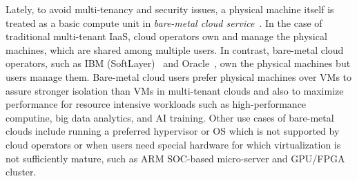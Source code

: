 Lately, to avoid multi-tenancy and security issues, a physical machine itself is 
treated as a basic compute unit in {\em bare-metal cloud service}~\cite{bms-wiki}.
In the case of traditional multi-tenant IaaS, cloud operators own and manage 
the physical machines, which are shared among multiple users.
In contrast, bare-metal cloud operators, 
such as  IBM (SoftLayer)~\cite{softlayer} and Oracle~\cite{oracle},
own the physical machines but users manage them. 
Bare-metal cloud users prefer physical machines over VMs
to assure stronger isolation than VMs in multi-tenant clouds and also 
to maximize performance for resource intensive workloads 
such as high-performance computine, big data analytics, and AI training.
Other use cases of bare-metal clouds include running a preferred hypervisor 
or OS which is not supported by cloud operators or
when users need special hardware for which virtualization 
is not sufficiently mature, such as ARM SOC-based micro-server and GPU/FPGA cluster.


